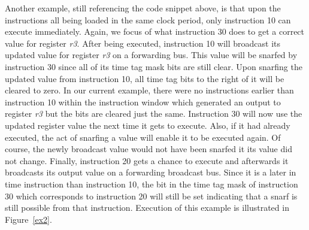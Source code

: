 Another example, still referencing the code snippet above,
is that upon the instructions all being loaded in the same
clock period, only instruction 10 can execute immediately.
Again, we focus of what instruction 30 does to get a correct
value for register
{\it r3}.
After being executed, instruction 10 will broadcast 
its updated value for register
{\it r3}
on a forwarding bus.
This value will be snarfed by instruction 30 since all of its
time tag mask bits are still clear.  Upon snarfing the updated
value from instruction 10, all time tag bits to the right of
it will be cleared to zero.  In our current example, there
were no instructions earlier than instruction 10 within the instruction
window which generated an output to register
{\it r3}
but the bits are cleared just the same.
Instruction 30 will now
use the updated register value the next time it gets to execute.
Also, if it had already executed, the act of snarfing a value will
enable it to be executed again.  Of course, the newly broadcast
value would not have been snarfed it its value did not change.
Finally, instruction 20 gets a chance to execute and afterwards it
broadcasts its output value on a forwarding broadcast bus.
Since it is a later in time instruction than instruction 10,
the bit in the time tag mask of instruction 30 which corresponds
to instruction 20 will still be set indicating that a snarf
is still possible from that instruction.
Execution of this example is illustrated in
Figure~\ref{ex2}.




